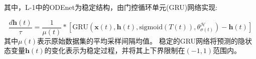 
其中，L-1中的ODEnet为稳定结构，由门控循环单元(GRU)网络实现\cite{Demeester2019}:

\begin{equation}
    \label{equ:dh}
    \frac{d \boldsymbol{h}(t)}{\tau} = \frac{1}{\mu(t)}*\left[\text{GRU}(\boldsymbol{x}(t), \boldsymbol{h}(t),\text{sigmoid}(T(t)), \theta^\mathcal{H}_{\sigma(t)}) - \boldsymbol{h}(t)\right]
\end{equation}
其中$\mu(t)$表示原始数据集的平均采样间隔均值。
稳定的GRU网络将预测的隐状态变量$\boldsymbol{h}(t)$的变化表示为稳定过程，并将其上下界限制在$(-1,1)$范围内。




